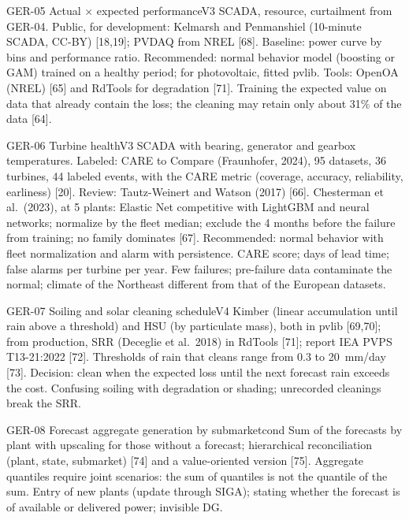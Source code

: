 \begin{ficha}{GER-05 \textperiodcentered{} Actual × expected performance}{V3}
 SCADA, resource, curtailment from GER-04. Public, for
development: Kelmarsh and Penmanshiel (10-minute SCADA, CC-BY) [18,19];
PVDAQ from NREL [68].
 Baseline: power curve by bins and
performance ratio. Recommended: normal behavior model (boosting or
GAM) trained on a healthy period; for photovoltaic, fitted pvlib.
Tools: OpenOA (NREL) [65] and RdTools for degradation [71].
 Training the expected value on data that already contain the loss; the
cleaning may retain only about 31\% of the data [64].
\end{ficha}

\begin{ficha}{GER-06 \textperiodcentered{} Turbine health}{V3}
 SCADA with bearing, generator and gearbox
temperatures. Labeled: CARE to Compare (Fraunhofer, 2024), 95 datasets, 36
turbines, 44 labeled events, with the CARE metric (coverage, accuracy,
reliability, earliness) [20].
 Review: Tautz-Weinert and Watson (2017) [66]. Chesterman et
al.\ (2023), at 5 plants: Elastic Net competitive with LightGBM and neural networks;
normalize by the fleet median; exclude the 4 months before the failure from training;
no family dominates [67]. Recommended: normal behavior with
fleet normalization and alarm with persistence.
 CARE score; days of lead time; false alarms per turbine
per year.
 Few failures; pre-failure data contaminate the normal; climate
of the Northeast different from that of the European datasets.
\end{ficha}

\begin{ficha}{GER-07 \textperiodcentered{} Soiling and solar cleaning schedule}{V4}
 Kimber (linear accumulation until rain above a threshold) and HSU
(by particulate mass), both in pvlib [69,70]; from production, SRR
(Deceglie et al.\ 2018) in RdTools [71]; report IEA PVPS T13-21:2022 [72].
Thresholds of rain that cleans range from 0.3 to 20~mm/day [73]. Decision: clean
when the expected loss until the next forecast rain exceeds the cost.
 Confusing soiling with degradation or shading;
unrecorded cleanings break the SRR.
\end{ficha}

\begin{ficha}{GER-08 \textperiodcentered{} Forecast aggregate generation by submarket}{cond}
 Sum of the forecasts by plant with upscaling for those without
a forecast; hierarchical reconciliation (plant, state, submarket) [74] and a
value-oriented version [75]. Aggregate quantiles require joint scenarios: the sum of
quantiles is not the quantile of the sum.
 Entry of new plants (update through SIGA); stating whether the
forecast is of available or delivered power; invisible DG.
\end{ficha}

